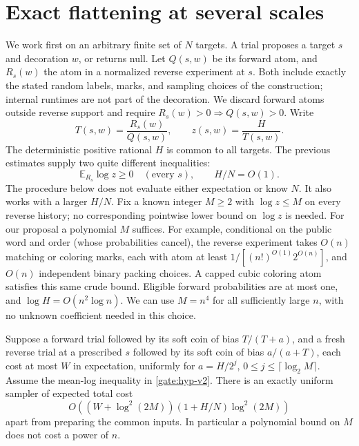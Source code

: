 \section{Exact flattening at several scales}\label{gate:multi-v2}

We work first on an arbitrary finite set of $N$ targets. A trial proposes a
target $s$ and decoration $w$, or returns null. Let $Q(s,w)$ be its
forward atom, and $R_s(w)$ the atom in a normalized reverse experiment
at $s$. Both include exactly the stated random labels, marks, and
sampling choices of the construction; internal runtimes are not part
of the decoration. We discard forward atoms outside reverse support
and require $R_s(w)>0\Rightarrow Q(s,w)>0$. Write
\[
 T(s,w)=\frac{R_s(w)}{Q(s,w)},\qquad z(s,w)=\frac{H}{T(s,w)} .
\]
The deterministic positive rational $H$ is common to all targets.
The previous estimates supply two quite different inequalities:
\begin{equation}\label{gate:hyp-v2}
 \mathbb E_{R_s}\log z\ge0\quad(\text{every }s),\qquad H/N=O(1).
\end{equation}
The procedure below does not evaluate either expectation or know $N$.
It also works with a larger $H/N$. Fix a known integer $M\ge2$
with $\log z\le M$ on every reverse history; no corresponding
pointwise lower bound on $\log z$ is needed. For our proposal a
polynomial $M$ suffices. For example, conditional on the public word
and order (whose probabilities cancel), the reverse experiment takes
$O(n)$ matching or coloring marks, each with atom at least
$1/[(n!)^{O(1)} 2^{O(n)}]$, and $O(n)$ independent binary packing
choices. A capped cubic coloring atom satisfies this same crude
bound. Eligible forward probabilities are at most one, and
$\log H=O(n^2\log n)$. We can use $M=n^4$ for all sufficiently large
$n$, with no unknown coefficient needed in this choice.

\begin{lemma}\label{gate:multiscale-v2}
Suppose a forward trial followed by its soft coin of bias $T/(T+a)$,
and a fresh reverse trial at a prescribed $s$ followed by its soft
coin of bias $a/(a+T)$, each cost at most $W$ in expectation,
uniformly for $a=H/2^j$, $0\le j\le\lceil\log_2M\rceil$.
Assume the mean-log inequality in \eqref{gate:hyp-v2}. There is an
exactly uniform sampler of expected total cost
\[
 O\!\left((W+\log^2(2M))(1+H/N)\log^2(2M)\right)
\]
apart from preparing the common inputs. In particular a polynomial
bound on $M$ does not cost a power of $n$.
\end{lemma}

